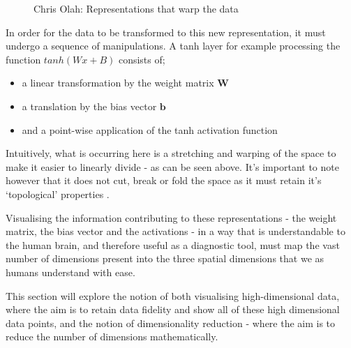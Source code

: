 \documentclass[a4paper,11pt,titlepage]{article}
\begin{document}
		\begin{figure}[H]
    			\centering	
    			\qquad
    			\caption{Chris Olah: Representations that warp the data}%
		\end{figure}		
		
		\par 
		In order for the data to be transformed to this new representation, it must undergo a sequence of manipulations. A tanh layer for example processing the function $ tanh(Wx + B) $ consists of; 
		\begin{itemize}
			\item a linear transformation by the weight matrix $ \bm{W} $
			\item a translation by the bias vector $ \bm{b} $
			\item and a point-wise application of the tanh activation function
		\end{itemize}
		Intuitively, what is occurring here is a stretching and warping of the space to make it easier to linearly divide - as can be seen above. It's important to note however that it does not cut, break or fold the space as it must retain it's `topological' properties \cite{Choi2005}.
	\par 
 	Visualising the information contributing to these representations - the weight matrix, the bias vector and the activations - in a way that is understandable to the human brain, and therefore useful as a diagnostic tool, must map the vast number of dimensions present into the three spatial dimensions that we as humans understand with ease. 
	\par 
	This section will explore the notion of both visualising high-dimensional data, where the aim is to retain data fidelity and show all of these high dimensional data points, and the notion of dimensionality reduction - where the aim is to reduce the number of dimensions mathematically.
\end{document}
